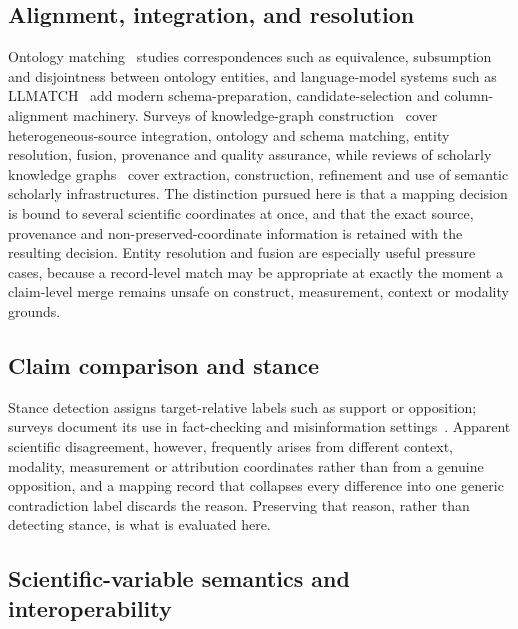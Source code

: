 \subsection{Alignment, integration, and resolution}

Ontology matching~\cite{euzenat2007ontology} studies correspondences such as
equivalence, subsumption and disjointness between ontology entities, and
language-model systems such as LLMATCH~\cite{llmatch2025} add modern
schema-preparation, candidate-selection and column-alignment machinery.
Surveys of knowledge-graph construction~\cite{hofer2024kgconstruction} cover
heterogeneous-source integration, ontology and schema matching, entity
resolution, fusion, provenance and quality assurance, while reviews of
scholarly knowledge graphs~\cite{verma2023scholarlykg} cover extraction,
construction, refinement and use of semantic scholarly infrastructures. The
distinction pursued here is that a mapping decision is bound to several
scientific coordinates at once, and that the exact source, provenance and
non-preserved-coordinate information is retained with the resulting decision.
Entity resolution and fusion are especially useful pressure cases, because a
record-level match may be appropriate at exactly the moment a claim-level
merge remains unsafe on construct, measurement, context or modality grounds.

\subsection{Claim comparison and stance}

Stance detection assigns target-relative labels such as support or opposition;
surveys document its use in fact-checking and misinformation
settings~\cite{hardalov2022stance}. Apparent scientific disagreement, however,
frequently arises from different context, modality, measurement or attribution
coordinates rather than from a genuine opposition, and a mapping record that
collapses every difference into one generic contradiction label discards the
reason. Preserving that reason, rather than detecting stance, is what is
evaluated here.

\subsection{Scientific-variable semantics and interoperability}

